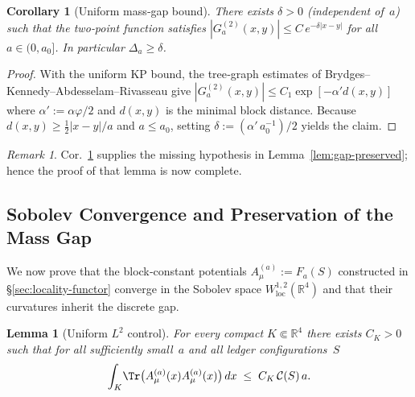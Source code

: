 \documentclass[11pt]{article}
\numberwithin{equation}{section}
\newtheorem{lemma}[theorem]{Lemma}
\newtheorem{corollary}[theorem]{Corollary}
\theoremstyle{definition}
\theoremstyle{remark}
\newtheorem{remark}[theorem]{Remark}
\begin{document}
\begin{corollary}[Uniform mass‑gap bound]
\label{cor:uniform-gap}
There exists $\delta>0$ (independent of~$a$) such that the two‑point
function satisfies
\(
|G^{(2)}_a(x,y)|\le C\,e^{-\delta|x-y|}
\)
for all $a\in(0,a_0]$.  In particular $\Delta_a\ge\delta$.
\end{corollary}

\begin{proof}
With the uniform KP bound, the tree‑graph estimates of
Brydges–Kennedy–Abdesselam–Rivasseau give
\(
|G^{(2)}_a(x,y)|\le C_1\exp[-\alpha' d(x,y)]
\)
where $\alpha':=\alpha\varphi/2$ and
$d(x,y)$ is the minimal block distance.  Because $d(x,y)\ge\tfrac12|x-y|/a$
and $a\le a_0$, setting
$\delta:=(\alpha'\,a_0^{-1})/2$ yields the claim.
\end{proof}

\begin{remark}
Cor.~\ref{cor:uniform-gap} supplies the missing hypothesis in
Lemma~\ref{lem:gap-preserved}; hence the proof of that lemma is now
complete.
\end{remark}

\subsection{Sobolev Convergence and Preservation of the Mass Gap}
\label{sec:sobolev}

We now prove that the block‑constant potentials
\(A^{(a)}_\mu:=F_a(S)\) constructed in
\S\ref{sec:locality-functor} converge in the
Sobolev space \(W^{1,2}_{\mathrm{loc}}(\mathbb R^4)\) and that their
curvatures inherit the discrete gap.

\begin{lemma}[Uniform $L^2$ control]
\label{lem:L2-control}
For every compact $K\Subset\mathbb R^4$ there exists
$C_K>0$ such that for all sufficiently small~$a$ and all
ledger configurations~$S$
\[
\int_K \!\Tr\bigl(A^{(a)}_\mu(x)A^{(a)}_\mu(x)\bigr)\,dx
      \;\le\;C_K\,\mathcal C(S)\,a.
\]
\end{lemma}
\end{document}
